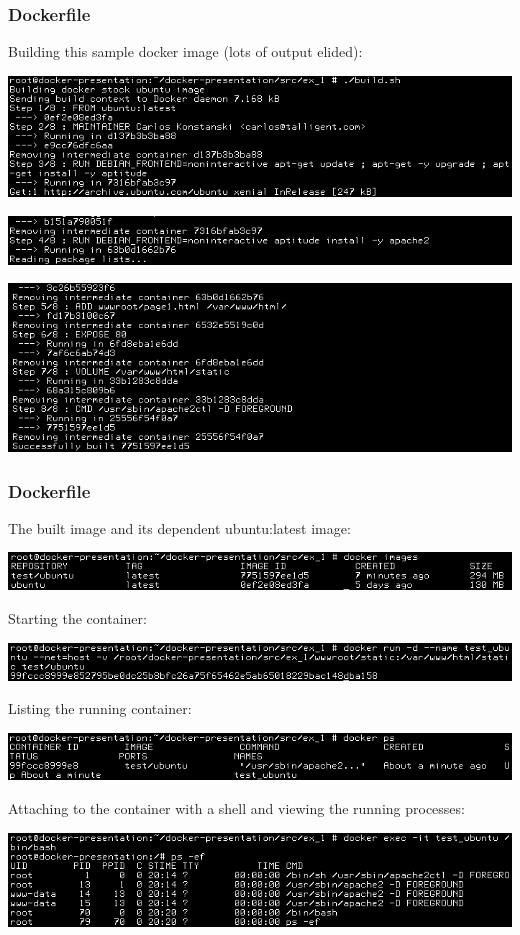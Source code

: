 \documentclass[helvetica,english,utf8,notitle,nologo]{beamer}
\begin{document}
\begin{frame}
  \frametitle{Dockerfile}

  Building this sample docker image (lots of output elided):

  \includegraphics[scale=0.44]{image_2}

  \includegraphics[scale=0.44]{image_5}

  \includegraphics[scale=0.44]{image_6}
\end{frame}

\begin{frame}
  \frametitle{Dockerfile}

  The built image and its dependent ubuntu:latest image:

  \includegraphics[scale=0.44]{image_7}

  Starting the container:

  \includegraphics[scale=0.44]{image_8}

  Listing the running container:

  \includegraphics[scale=0.44]{image_9}

  Attaching to the container with a shell and viewing the running
  processes:

  \includegraphics[scale=0.44]{image_10}
\end{frame}
\end{document}
